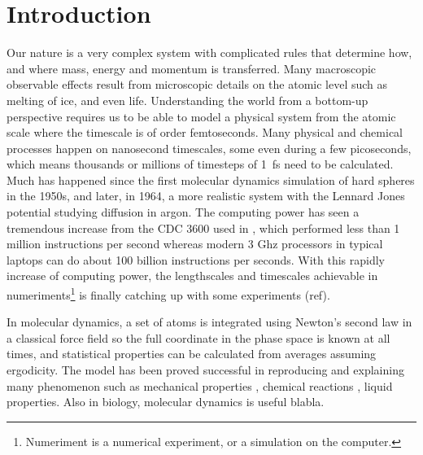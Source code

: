 \documentclass[aps,pre,twocolumn,letterpaper,floatfix,nofootinbib]{revtex4}
\begin{document}
\section{Introduction}
Our nature is a very complex system with complicated rules that determine how, and where mass, energy and momentum is transferred.
Many macroscopic observable effects result from microscopic details on the atomic level such as melting of ice, and even life.
Understanding the world from a bottom-up perspective requires us to be able to model a physical system from the atomic scale where the timescale is of order femtoseconds.
Many physical and chemical processes happen on nanosecond timescales, some even during a few picoseconds, which means thousands or millions of timesteps of \SI{1}{\femto\second} need to be calculated.
Much has happened since the first molecular dynamics simulation of hard spheres in the 1950s\citep{alder1957phase,alder1959studies}, and later, in 1964, a more realistic system with the Lennard Jones potential studying diffusion in argon\citep{rahman1964correlations}.
The computing power has seen a tremendous increase from the CDC 3600 used in \citep{rahman1964correlations}, which performed less than 1 million instructions per second whereas modern 3 Ghz processors in typical laptops can do about 100 billion instructions per seconds.
With this rapidly increase of computing power, the lengthscales and timescales achievable in numeriments\footnote{Numeriment is a numerical experiment, or a simulation on the computer.} is finally catching up with some experiments (ref).

In molecular dynamics, a set of atoms is integrated using Newton's second law in a classical force field so the full coordinate in the phase space is known at all times, and statistical properties can be calculated from averages assuming ergodicity\citep{martyna1994constant}.
The model has been proved successful in reproducing and explaining many phenomenon such as mechanical properties \citep{jiang2009young, campbell1999structural, ning2012mechanical}, chemical reactions \citep{van2001reaxff, brenner2002second}, liquid properties\citep{allen2017computer}.
Also in biology, molecular dynamics is useful blabla. 
\end{document}
